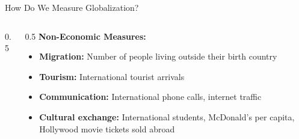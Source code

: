 \documentclass{beamer}
\begin{document}
\begin{frame}{How Do We Measure Globalization?}
\begin{columns}
\begin{column}{0.5\textwidth}
\begin{itemize}
    \end{itemize}
\end{column}
\begin{column}{0.5\textwidth}
    \textbf{Non-Economic Measures:}
    \begin{itemize} \footnotesize
        \item \textbf{Migration:} Number of people living outside their birth country 
        \item \textbf{Tourism:} International tourist arrivals
        \item \textbf{Communication:} International phone calls, internet traffic
        \item \textbf{Cultural exchange:} International students, McDonald's per capita, Hollywood movie tickets sold abroad
    \end{itemize}
\end{column}
\end{columns}
\end{frame}
\end{document}
